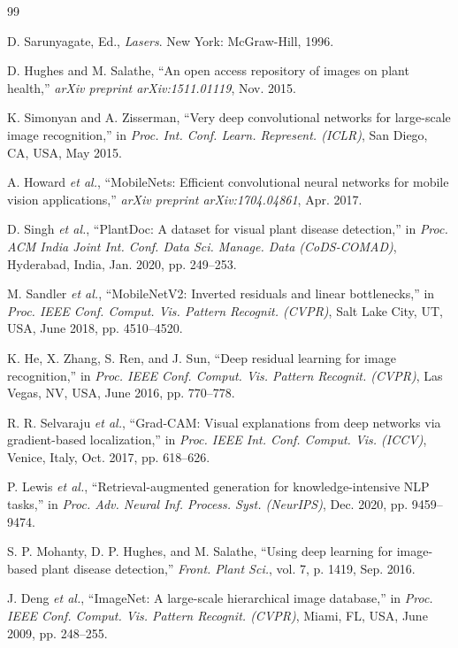 \documentclass[12pt, a4paper]{report}
\begin{document}
\begin{thebibliography}{99}

D. Sarunyagate, Ed., \textit{Lasers}. New York: McGraw-Hill, 1996.

D. Hughes and M. Salathe, ``An open access repository of images on plant health,'' \textit{arXiv preprint arXiv:1511.01119}, Nov. 2015.

K. Simonyan and A. Zisserman, ``Very deep convolutional networks for large-scale image recognition,'' in \textit{Proc. Int. Conf. Learn. Represent. (ICLR)}, San Diego, CA, USA, May 2015.

A. Howard \textit{et al.}, ``MobileNets: Efficient convolutional neural networks for mobile vision applications,'' \textit{arXiv preprint arXiv:1704.04861}, Apr. 2017.

D. Singh \textit{et al.}, ``PlantDoc: A dataset for visual plant disease detection,'' in \textit{Proc. ACM India Joint Int. Conf. Data Sci. Manage. Data (CoDS-COMAD)}, Hyderabad, India, Jan. 2020, pp. 249--253.

M. Sandler \textit{et al.}, ``MobileNetV2: Inverted residuals and linear bottlenecks,'' in \textit{Proc. IEEE Conf. Comput. Vis. Pattern Recognit. (CVPR)}, Salt Lake City, UT, USA, June 2018, pp. 4510--4520.

K. He, X. Zhang, S. Ren, and J. Sun, ``Deep residual learning for image recognition,'' in \textit{Proc. IEEE Conf. Comput. Vis. Pattern Recognit. (CVPR)}, Las Vegas, NV, USA, June 2016, pp. 770--778.

R. R. Selvaraju \textit{et al.}, ``Grad-CAM: Visual explanations from deep networks via gradient-based localization,'' in \textit{Proc. IEEE Int. Conf. Comput. Vis. (ICCV)}, Venice, Italy, Oct. 2017, pp. 618--626.

P. Lewis \textit{et al.}, ``Retrieval-augmented generation for knowledge-intensive NLP tasks,'' in \textit{Proc. Adv. Neural Inf. Process. Syst. (NeurIPS)}, Dec. 2020, pp. 9459--9474.

S. P. Mohanty, D. P. Hughes, and M. Salathe, ``Using deep learning for image-based plant disease detection,'' \textit{Front. Plant Sci.}, vol. 7, p. 1419, Sep. 2016.

J. Deng \textit{et al.}, ``ImageNet: A large-scale hierarchical image database,'' in \textit{Proc. IEEE Conf. Comput. Vis. Pattern Recognit. (CVPR)}, Miami, FL, USA, June 2009, pp. 248--255.


\end{thebibliography}
\end{document}
